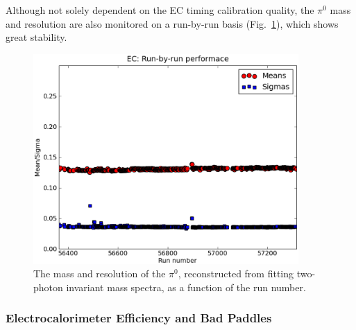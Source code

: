 Although not solely dependent on the EC timing calibration quality, the $\pi^0$ mass and resolution are also monitored on a run-by-run basis (Fig.~\ref{ecpi0m}), which shows great stability.

\begin{figure}[h]
\begin{center}
 \includegraphics[width=0.9\textwidth]{figures/calib/ec/ec_pi0mass.eps}
  \caption{The mass and resolution of the $\pi^0$, reconstructed from fitting two-photon invariant mass spectra, as a function of the run number.}
  \label{ecpi0m}
  \end{center}
\end{figure}

\subsubsection{\label{sec:calib.ec.eff}Electrocalorimeter Efficiency and Bad Paddles}

\FloatBarrier
